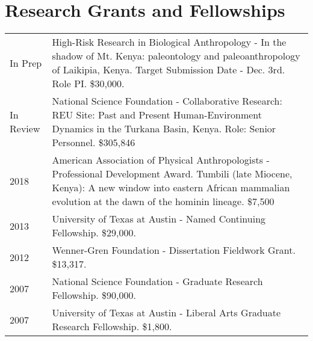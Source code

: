 \documentclass{article}
\begin{document}
\section*{Research Grants and Fellowships}
\begin{tabular}{p{}p{}}
In Prep & High-Risk Research in Biological Anthropology - In the shadow of Mt. Kenya: paleontology and paleoanthropology of Laikipia, Kenya. Target Submission Date - Dec. 3rd. Role PI. \$30,000.\\[4pt]
In Review &  National Science Foundation - Collaborative Research: REU Site: Past and Present Human-Environment Dynamics in the Turkana Basin, Kenya. Role: Senior Personnel. \$305,846\\[4pt]
2018 & American Association of Physical Anthropologists - Professional Development Award. Tumbili (late Miocene, Kenya): A new window into eastern African mammalian evolution at the dawn of the hominin lineage. \$7,500\\[4pt]
2013 &  University of Texas at Austin - Named Continuing Fellowship. \$29,000.\\[4pt]
2012  & Wenner-Gren Foundation - Dissertation Fieldwork Grant. \$13,317.\\[4pt]
2007 &  National Science Foundation - Graduate Research Fellowship. \$90,000.\\[4pt]
2007 &  University of Texas at Austin - Liberal Arts Graduate Research Fellowship. \$1,800.\\[4pt]

\end{tabular}
\end{document}
